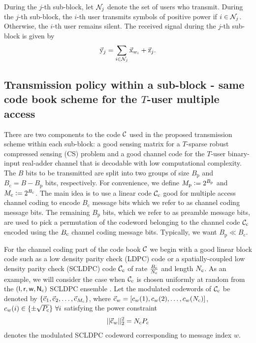During the $j$-th sub-block, let $\mathcal{N}_j$ denote the set of users who transmit. During the $j$-th sub-block, the $i$-th user transmits symbols of positive power if $i \in \mathcal{N}_j$. Otherwise, the $i$-th user remains silent. The received signal during the $j$-th sub-block is given by
\begin{equation}
\vec{\mathrm{y}}_j = \sum_{i\in \mathcal{N}_j} \vec{\mathrm{x}}_{w_i} + \vec{\mathrm{z}}_j.
\end{equation}

\subsection{Transmission policy within a sub-block - same code book scheme for the $T$-user multiple access}
There are two components to the code $\mathcal{C}$ used in the proposed transmission scheme within each sub-block: a good sensing matrix for a $T$-sparse robust compressed sensing (CS) problem and a good channel code for the $T$-user binary-input real-adder channel that is decodable with low computational complexity. The $B$ bits to be transmitted are split into two groups of size $B_{\mathrm{p}}$ and $B_{\mathrm{c}} = B-B_{\mathrm{p}}$ bits, respectively. For convenience, we define $M_{\mathrm{p}} \mathrel{\mathop:}= 2^{B_{\mathrm{p}}}$ and $M_{\mathrm{c}} \mathrel{\mathop:}= 2^{B_{\mathrm{c}}}$. The main idea is to use a linear code $\mathcal{C}_{\textrm{c}}$ good for multiple access channel coding to encode $B_{\mathrm{c}}$ message bits which we refer to as channel coding message bits. The remaining $B_{\mathrm{p}}$ bits, which we refer to as preamble message bits, are used to pick a permutation of the codeword belonging to the channel code $\mathcal{C}_{\textrm{c}}$ encoded using the $B_{\mathrm{c}}$ channel coding message bits. Typically, we want $B_{\mathrm{p}} \ll B_{\mathrm{c}}$.

For the channel coding part of the code book $\mathcal{C}$ we begin with a good linear block code such as a low density parity check (LDPC) code or a spatially-coupled low density parity check (SCLDPC) code $\mathcal{C}_\text{c}$ of rate $\frac{B_\mathrm{c}}{N_{\mathrm{c}}}$ and length $N_{\mathrm{c}}$. As an example, we will consider the case when $\mathcal{C}_{\text{c}}$ is chosen uniformly at random from the $(\sf{l,r,w},N_{\mathrm{c}})$ SCLDPC ensemble \cite{kudekar2011threshold}. Let the modulated codewords of $\mathcal{C}_{\text{c}}$ be denoted by $\{\vec{\mathrm{c}}_1,\vec{\mathrm{c}}_2,\ldots,\vec{\mathrm{c}}_{M_\mathrm{c}} \}$, where $\vec{\mathrm{c}}_{w} = [c_{w}(1),c_{w}(2),\ldots,c_{w}(N_{\mathrm{c}})]$,  $c_{w}(i)\in\{\pm\sqrt{P_{\mathrm{c}}}\}~\forall i$ satisfying the power constraint
\begin{align}
||\vec{\mathrm{c}}_w||_2^2= N_{\mathrm{c}} P_{\mathrm{c}}
\label{eqn:mac_powerconstraint}
\end{align}
denotes the modulated SCLDPC codeword corresponding to message index $w$. 


